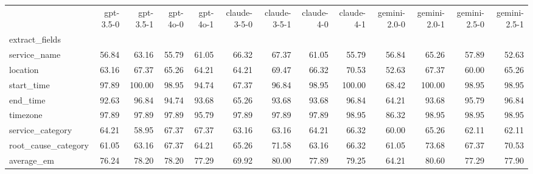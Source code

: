 \begin{tabular}{lrrrrrrrrrrrr}
\toprule
 & gpt-3.5-0 & gpt-3.5-1 & gpt-4o-0 & gpt-4o-1 & claude-3-5-0 & claude-3-5-1 & claude-4-0 & claude-4-1 & gemini-2.0-0 & gemini-2.0-1 & gemini-2.5-0 & gemini-2.5-1 \\
extract_fields &  &  &  &  &  &  &  &  &  &  &  &  \\
\midrule
service_name & 56.84 & 63.16 & 55.79 & 61.05 & 66.32 & 67.37 & 61.05 & 55.79 & 56.84 & 65.26 & 57.89 & 52.63 \\
location & 63.16 & 67.37 & 65.26 & 64.21 & 64.21 & 69.47 & 66.32 & 70.53 & 52.63 & 67.37 & 60.00 & 65.26 \\
start_time & 97.89 & 100.00 & 98.95 & 94.74 & 67.37 & 96.84 & 98.95 & 100.00 & 68.42 & 100.00 & 98.95 & 98.95 \\
end_time & 92.63 & 96.84 & 94.74 & 93.68 & 65.26 & 93.68 & 93.68 & 96.84 & 64.21 & 93.68 & 95.79 & 96.84 \\
timezone & 97.89 & 97.89 & 97.89 & 95.79 & 97.89 & 97.89 & 97.89 & 98.95 & 86.32 & 98.95 & 98.95 & 98.95 \\
service_category & 64.21 & 58.95 & 67.37 & 67.37 & 63.16 & 63.16 & 64.21 & 66.32 & 60.00 & 65.26 & 62.11 & 62.11 \\
root_cause_category & 61.05 & 63.16 & 67.37 & 64.21 & 65.26 & 71.58 & 63.16 & 66.32 & 61.05 & 73.68 & 67.37 & 70.53 \\
average_em & 76.24 & 78.20 & 78.20 & 77.29 & 69.92 & 80.00 & 77.89 & 79.25 & 64.21 & 80.60 & 77.29 & 77.90 \\
\bottomrule
\end{tabular}
